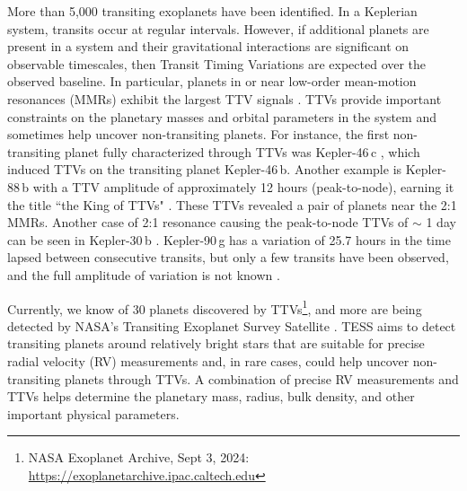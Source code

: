 \documentclass[twocolumn,twocolappendix]{aastex631}
\begin{document}
More than 5,000 transiting exoplanets have been identified. In a Keplerian system, transits occur at regular intervals. However, if additional planets are present in a system and their gravitational interactions are significant on observable timescales, then Transit Timing Variations \citep[TTVs,][]{TTV1,TTV2} are expected over the observed baseline. In particular, planets in or near low-order mean-motion resonances (MMRs) exhibit the largest TTV signals \citep{AGOL2005}. TTVs provide important constraints on the planetary masses and orbital parameters in the system and sometimes help uncover non-transiting planets. For instance, the first non-transiting planet fully characterized through TTVs was Kepler-46\,c \citep{KEPLER46}, which induced TTVs on the transiting planet Kepler-46\,b. Another example is Kepler-88\,b with a TTV amplitude of approximately 12 hours (peak-to-node), earning it the title ``the King of TTVs" \citep{KOI-142}. These TTVs revealed a pair of planets near the 2:1 MMRs. Another case of 2:1 resonance causing the peak-to-node TTVs of $\sim$ 1 day can be seen in Kepler-30\,b \citep{Kepler30a,Kepler30b}. Kepler-90\,g has a variation of 25.7 hours in the time lapsed between consecutive transits, but only a few transits have been observed, and the full amplitude of variation is not known \citep{Kepler90}.

Currently, we know of 30 planets discovered by TTVs\footnote{NASA Exoplanet Archive, Sept 3, 2024: \url{https://exoplanetarchive.ipac.caltech.edu}}, and more are being detected by NASA’s Transiting Exoplanet Survey Satellite \citep[TESS,][]{TESS}. TESS aims to detect transiting planets around relatively bright stars that are suitable for precise radial velocity (RV) measurements and, in rare cases, could help uncover non-transiting planets through TTVs. A combination of precise RV measurements and TTVs helps determine the planetary mass, radius, bulk density, and other important physical parameters.
\end{document}

